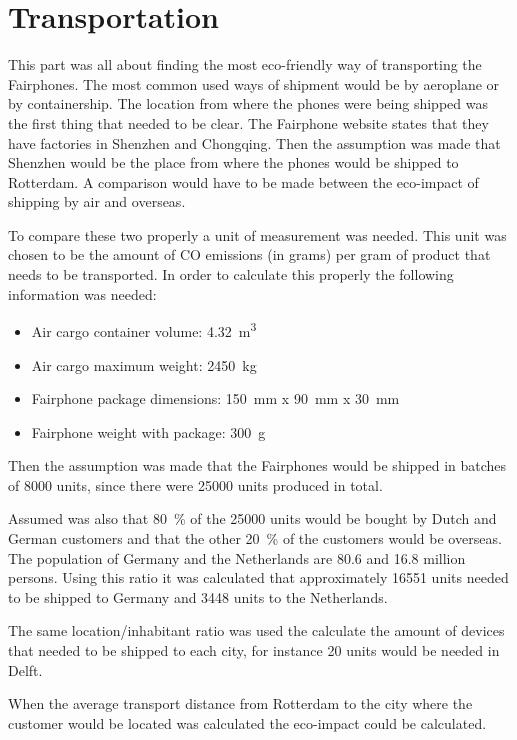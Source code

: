 \documentclass[final,a4paper]{report} %
\begin{document}
\chapter{Transportation} %
\label{ch:transportation}

This part was all about finding the most eco-friendly way of transporting the Fairphones.
The most common used ways of shipment would be by aeroplane or by containership.
The location from where the phones were being shipped was the first thing that needed to be clear. 
The Fairphone website states that they have factories in Shenzhen and Chongqing. 
Then the assumption was made that Shenzhen would be the place from where the phones would be shipped to Rotterdam. 
A comparison would have to be made between the eco-impact of shipping by air and overseas.  

To compare these two properly a unit of measurement was needed.
This unit was chosen to be the amount of CO emissions (in grams) per gram of product that needs to be transported.
In order to calculate this properly the following information was needed:

\begin{itemize}
\item Air cargo container volume: \SI{4.32}{\cubic\meter}
\item Air cargo maximum weight: \SI{2450}{\kilo\gram}
\item Fairphone package dimensions: \SI{150}{\milli\meter} x \SI{90}{\milli\meter} x \SI{30}{\milli\meter}
\item Fairphone weight with package: \SI{300}{\gram}
\end{itemize}
Then the assumption was made that the Fairphones would be shipped in batches of \num{8000} units, since there were \num{25000} units produced in total.

Assumed was also that \SI{80}{\percent} of the \num{25000} units would be bought by Dutch and German customers and that the other \SI{20}{\percent} of the customers would be overseas.
The population of Germany and the Netherlands are \num{80.6} and \num{16.8} million persons.
Using this ratio it was calculated that approximately \num{16551} units needed to be shipped to Germany and \num{3448} units to the Netherlands. 

The same location/inhabitant ratio was used the calculate the amount of devices that needed to be shipped to each city, for instance \num{20} units would be needed in Delft.

When the average transport distance from Rotterdam to the city where the customer would be located was calculated the eco-impact could be calculated.
 
\end{document}

